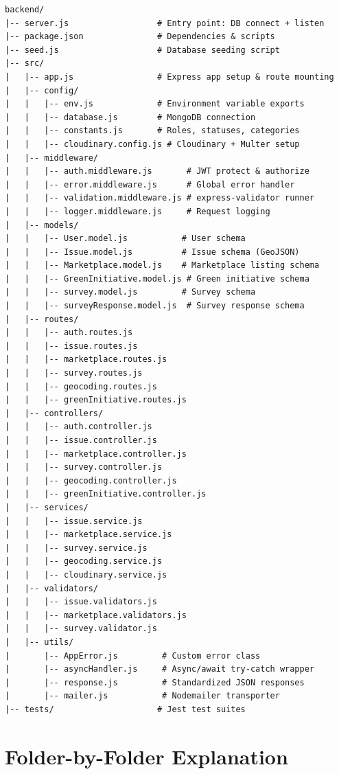 \documentclass[12pt,a4paper]{article}
\begin{document}
\begin{lstlisting}[style=jscode, title={\textbf{Backend File Tree}}]
backend/
|-- server.js                  # Entry point: DB connect + listen
|-- package.json               # Dependencies & scripts
|-- seed.js                    # Database seeding script
|-- src/
|   |-- app.js                 # Express app setup & route mounting
|   |-- config/
|   |   |-- env.js             # Environment variable exports
|   |   |-- database.js        # MongoDB connection
|   |   |-- constants.js       # Roles, statuses, categories
|   |   |-- cloudinary.config.js # Cloudinary + Multer setup
|   |-- middleware/
|   |   |-- auth.middleware.js       # JWT protect & authorize
|   |   |-- error.middleware.js      # Global error handler
|   |   |-- validation.middleware.js # express-validator runner
|   |   |-- logger.middleware.js     # Request logging
|   |-- models/
|   |   |-- User.model.js           # User schema
|   |   |-- Issue.model.js          # Issue schema (GeoJSON)
|   |   |-- Marketplace.model.js    # Marketplace listing schema
|   |   |-- GreenInitiative.model.js # Green initiative schema
|   |   |-- survey.model.js         # Survey schema
|   |   |-- surveyResponse.model.js  # Survey response schema
|   |-- routes/
|   |   |-- auth.routes.js
|   |   |-- issue.routes.js
|   |   |-- marketplace.routes.js
|   |   |-- survey.routes.js
|   |   |-- geocoding.routes.js
|   |   |-- greenInitiative.routes.js
|   |-- controllers/
|   |   |-- auth.controller.js
|   |   |-- issue.controller.js
|   |   |-- marketplace.controller.js
|   |   |-- survey.controller.js
|   |   |-- geocoding.controller.js
|   |   |-- greenInitiative.controller.js
|   |-- services/
|   |   |-- issue.service.js
|   |   |-- marketplace.service.js
|   |   |-- survey.service.js
|   |   |-- geocoding.service.js
|   |   |-- cloudinary.service.js
|   |-- validators/
|   |   |-- issue.validators.js
|   |   |-- marketplace.validators.js
|   |   |-- survey.validator.js
|   |-- utils/
|       |-- AppError.js         # Custom error class
|       |-- asyncHandler.js     # Async/await try-catch wrapper
|       |-- response.js         # Standardized JSON responses
|       |-- mailer.js           # Nodemailer transporter
|-- tests/                     # Jest test suites
\end{lstlisting}

\section{Folder-by-Folder Explanation}
\end{document}
